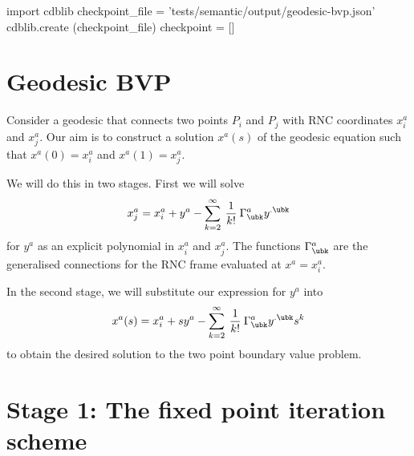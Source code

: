 \documentclass[12pt]{cdblatex}
\begin{document}

\bgroup
{}
\begin{cadabra}
   import cdblib
   checkpoint_file = 'tests/semantic/output/geodesic-bvp.json'
   cdblib.create (checkpoint_file)
   checkpoint = []
\end{cadabra}
\egroup

\section*{Geodesic BVP}

Consider a geodesic that connects two points $P_i$ and $P_j$ with RNC coordinates
$x^a_i$ and $x^a_j$. Our aim is to construct a solution $x^a(s)$ of the geodesic
equation such that $x^a(0)= x^a_i$ and $x^a(1)=x^a_j$.

We will do this in two stages. First we will solve
\begin{align}
   \label{eq:twoptBVP}
   x^a_j = x^a_i + y^a - \sum_{k=2}^\infty\>\frac{1}{k!}\>\Gamma^{a}_{\ubk}y^{.\ubk}
\end{align}
for $y^a$ as an explicit polynomial in $x^a_i$ and $x^a_j$. The functions $\Gamma^{a}_{\ubk}$ are
the generalised connections for the RNC frame evaluated at $x^a=x^a_i$.

In the second stage, we will substitute our expression for $y^a$ into
\begin{align}
   \label{eq:solBVP}
   x^a(s) = x^a_i + s y^a - \sum_{k=2}^\infty\>\frac{1}{k!}\>\Gamma^{a}_{\ubk}y^{.\ubk} s^k
\end{align}
to obtain the desired solution to the two point boundary value problem.

\section*{Stage 1: The fixed point iteration scheme}
\end{document}
